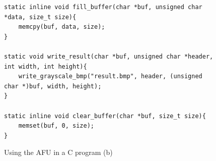 \documentclass[epsfig,10pt,fullpage]{article}
\begin{document}
\lstset{language=C,numbers=left,escapechar=|}
\begin{figure}
\begin{center}
\begin{minipage}[h]{17 cm}
\begin{lstlisting}[name=C_code]
static inline void fill_buffer(char *buf, unsigned char *data, size_t size){
    memcpy(buf, data, size);
}

static void write_result(char *buf, unsigned char *header, int width, int height){
	write_grayscale_bmp("result.bmp", header, (unsigned char *)buf, width, height);
}

static inline void clear_buffer(char *buf, size_t size){
	memset(buf, 0, size);
}
\end{lstlisting}
\end{minipage}
\caption{Using the AFU in a C program (b)}
\label{fig:C_code}
\end{center}
\end{figure}
\end{document}
